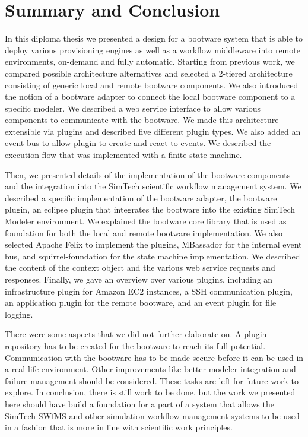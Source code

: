 \chapter{Summary and Conclusion}
\label{conclusion}

In this diploma thesis we presented a design for a bootware system that is able to deploy various provisioning engines as well as a workflow middleware into remote environments, on-demand and fully automatic.
Starting from previous work, we compared possible architecture alternatives and selected a 2-tiered architecture consisting of generic local and remote bootware components.
We also introduced the notion of a bootware adapter to connect the local bootware component to a specific modeler.
We described a web service interface to allow various components to communicate with the bootware.
We made this architecture extensible via plugins and described five different plugin types.
We also added an event bus to allow plugin to create and react to events.
We described the execution flow that was implemented with a finite state machine.

Then, we presented details of the implementation of the bootware components and the integration into the SimTech scientific workflow management system.
We described a specific implementation of the bootware adapter, the bootware plugin, an eclipse plugin that integrates the bootware into the existing SimTech Modeler environment.
We explained the bootware core library that is used as foundation for both the local and remote bootware implementation.
We also selected Apache Felix to implement the plugins, MBassador for the internal event bus, and squirrel-foundation for the state machine implementation.
We described the content of the context object and the various web service requests and responses.
Finally, we gave an overview over various plugins, including an infrastructure plugin for Amazon EC2 instances, a SSH communication plugin, an application plugin for the remote bootware, and an event plugin for file logging.

There were some aspects that we did not further elaborate on.
A plugin repository has to be created for the bootware to reach its full potential.
Communication with the bootware has to be made secure before it can be used in a real life environment.
Other improvements like better modeler integration and failure management should be considered.
These tasks are left for future work to explore.
In conclusion, there is still work to be done, but the work we presented here should have build a foundation for a part of a system that allows the SimTech SWfMS and other simulation workflow management systems to be used in a fashion that is more in line with scientific work principles.
